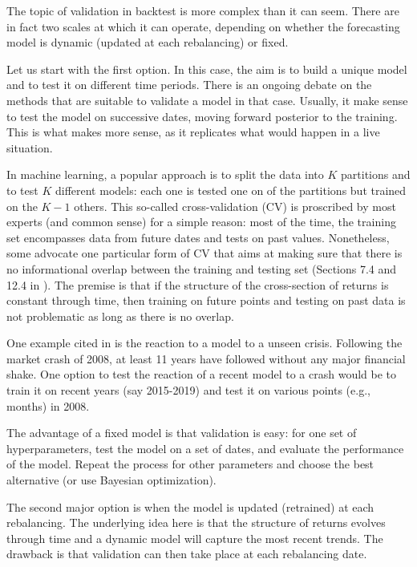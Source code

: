 \documentclass[]{krantz}
\theoremstyle{definition}
\theoremstyle{definition}
\theoremstyle{definition}
\theoremstyle{remark}
\begin{document}
The topic of validation in backtest is more complex than it can seem.
There are in fact two scales at which it can operate, depending on
whether the forecasting model is dynamic (updated at each rebalancing)
or fixed.

Let us start with the first option. In this case, the aim is to build a
unique model and to test it on different time periods. There is an
ongoing debate on the methods that are suitable to validate a model in
that case. Usually, it make sense to test the model on successive dates,
moving forward posterior to the training. This is what makes more sense,
as it replicates what would happen in a live situation.

In machine learning, a popular approach is to split the data into \(K\)
partitions and to test \(K\) different models: each one is tested one on
of the partitions but trained on the \(K-1\) others. This so-called
cross-validation (CV) is proscribed by most experts (and common sense)
for a simple reason: most of the time, the training set encompasses data
from future dates and tests on past values. Nonetheless, some advocate
one particular form of CV that aims at making sure that there is no
informational overlap between the training and testing set (Sections 7.4
and 12.4 in \citet{de2018advances}). The premise is that if the
structure of the cross-section of returns is constant through time, then
training on future points and testing on past data is not problematic as
long as there is no overlap.

One example cited in \citet{de2018advances} is the reaction to a model
to a unseen crisis. Following the market crash of 2008, at least 11
years have followed without any major financial shake. One option to
test the reaction of a recent model to a crash would be to train it on
recent years (say 2015-2019) and test it on various points (e.g.,
months) in 2008.

The advantage of a fixed model is that validation is easy: for one set
of hyperparameters, test the model on a set of dates, and evaluate the
performance of the model. Repeat the process for other parameters and
choose the best alternative (or use Bayesian optimization).

The second major option is when the model is updated (retrained) at each
rebalancing. The underlying idea here is that the structure of returns
evolves through time and a dynamic model will capture the most recent
trends. The drawback is that validation can then take place at each
rebalancing date.
\end{document}
